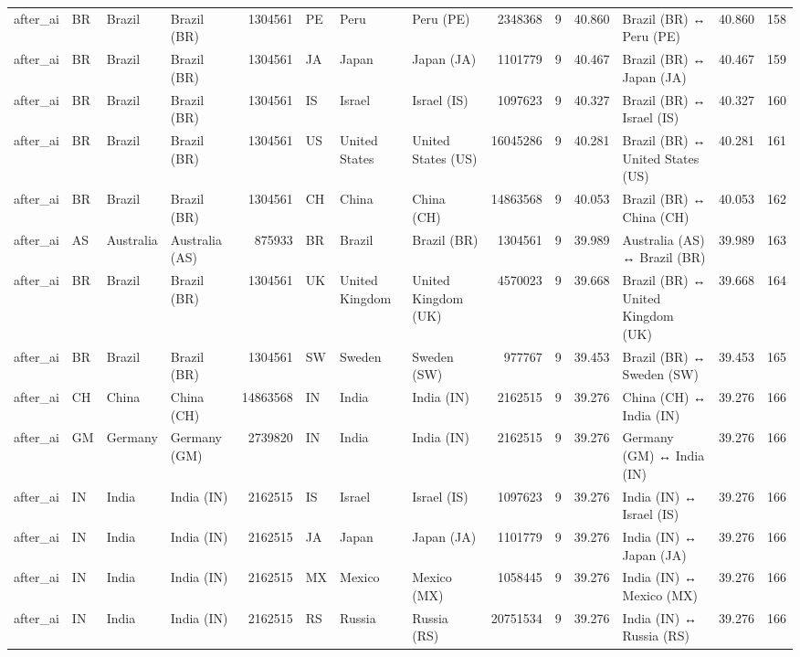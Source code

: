 \begin{tabular}{llllrlllrrrlrr}
after\_ai & BR & Brazil & Brazil (BR) & 1304561 & PE & Peru & Peru (PE) & 2348368 & 9 & 40.860 & Brazil (BR) ↔ Peru (PE) & 40.860 & 158 \\
after\_ai & BR & Brazil & Brazil (BR) & 1304561 & JA & Japan & Japan (JA) & 1101779 & 9 & 40.467 & Brazil (BR) ↔ Japan (JA) & 40.467 & 159 \\
after\_ai & BR & Brazil & Brazil (BR) & 1304561 & IS & Israel & Israel (IS) & 1097623 & 9 & 40.327 & Brazil (BR) ↔ Israel (IS) & 40.327 & 160 \\
after\_ai & BR & Brazil & Brazil (BR) & 1304561 & US & United States & United States (US) & 16045286 & 9 & 40.281 & Brazil (BR) ↔ United States (US) & 40.281 & 161 \\
after\_ai & BR & Brazil & Brazil (BR) & 1304561 & CH & China & China (CH) & 14863568 & 9 & 40.053 & Brazil (BR) ↔ China (CH) & 40.053 & 162 \\
after\_ai & AS & Australia & Australia (AS) & 875933 & BR & Brazil & Brazil (BR) & 1304561 & 9 & 39.989 & Australia (AS) ↔ Brazil (BR) & 39.989 & 163 \\
after\_ai & BR & Brazil & Brazil (BR) & 1304561 & UK & United Kingdom & United Kingdom (UK) & 4570023 & 9 & 39.668 & Brazil (BR) ↔ United Kingdom (UK) & 39.668 & 164 \\
after\_ai & BR & Brazil & Brazil (BR) & 1304561 & SW & Sweden & Sweden (SW) & 977767 & 9 & 39.453 & Brazil (BR) ↔ Sweden (SW) & 39.453 & 165 \\
after\_ai & CH & China & China (CH) & 14863568 & IN & India & India (IN) & 2162515 & 9 & 39.276 & China (CH) ↔ India (IN) & 39.276 & 166 \\
after\_ai & GM & Germany & Germany (GM) & 2739820 & IN & India & India (IN) & 2162515 & 9 & 39.276 & Germany (GM) ↔ India (IN) & 39.276 & 166 \\
after\_ai & IN & India & India (IN) & 2162515 & IS & Israel & Israel (IS) & 1097623 & 9 & 39.276 & India (IN) ↔ Israel (IS) & 39.276 & 166 \\
after\_ai & IN & India & India (IN) & 2162515 & JA & Japan & Japan (JA) & 1101779 & 9 & 39.276 & India (IN) ↔ Japan (JA) & 39.276 & 166 \\
after\_ai & IN & India & India (IN) & 2162515 & MX & Mexico & Mexico (MX) & 1058445 & 9 & 39.276 & India (IN) ↔ Mexico (MX) & 39.276 & 166 \\
after\_ai & IN & India & India (IN) & 2162515 & RS & Russia & Russia (RS) & 20751534 & 9 & 39.276 & India (IN) ↔ Russia (RS) & 39.276 & 166 \\

\end{tabular}
